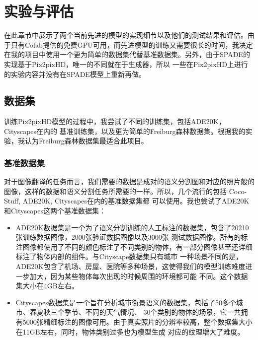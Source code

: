 \documentclass[supercite]{HustGraduPaper}
\theoremstyle{definition}
\begin{document}
\section{实验与评估}
\label{sec:four}

在此章节中展示了两个当前先进的模型的实现细节以及他们的测试结果和评估。由于只有Colab提供的免费GPU可用，而先进模型的训练又需要很长的时间，我决定
在我的项目中使用一个更为简单的数据集\cite{valada16iser}代替基准数据集。另外，由于SPADE的实现基于Pix2pixHD，唯一的不同就在于生成器，所以
一些在Pix2pixHD上进行的实验内容并没有在SPADE模型上重新再做。

\subsection{数据集}

训练Pix2pixHD模型的过程中，我尝试了不同的训练集，包括ADE20K\cite{zhou2017scene}，Cityscapes\cite{Cordts2016Cityscapes}在内的
基准训练集，以及更为简单的Freiburg森林数据集\cite{valada16iser}。根据我的实验，我认为Freiburg森林数据集最适合此项目。

\subsubsection{基准数据集}

对于图像翻译的任务而言，我们需要的数据是成对的语义分割图和对应的照片般的图像，这样的数据和语义分割任务所需要的一样。所以，几个流行的包括
Coco-Stuff\cite{caesar2018cvpr}, ADE20K\cite{zhou2017scene}, Cityscapes\cite{Cordts2016Cityscapes}在内的基准数据集都
可以使用。我也尝试了ADE20K和Cityscapes这两个基准数据集：
\begin{itemize}
  \item ADE20K数据集\cite{zhou2017scene}是一个为了语义分割训练的人工标注的数据集，包含了20210张训练数据图像，2000张验证数据图像以及3000张
  测试数据图像。所有的标注图像都使用了不同的颜色标注了不同类别的物体，有一部分图像甚至还详细标注了物体内部的组件。与Cityscape数据集只有城市
  一种场景不同的是，ADE20K包含了机场、房屋、医院等多种场景，这使得我们的模型训练难度进一步加大，因为某些物体每次出现的时候周围的环境都可能
  不同。这个数据集大小在4GB左右。
  \item Cityscapes数据集\cite{Cordts2016Cityscapes}是一个旨在分析城市街景语义的数据集，包括了50多个城市、春夏秋三个季节、不同的天气情况、
  30个类别的物体的场景，它一共拥有5000张精细标注的图像可用。由于真实照片的分辨率较高，整个数据集大小在11GB左右，同时，物体类别过多也为模型生成
  对应的纹理增大了难度。
\end{itemize}
\end{document}
